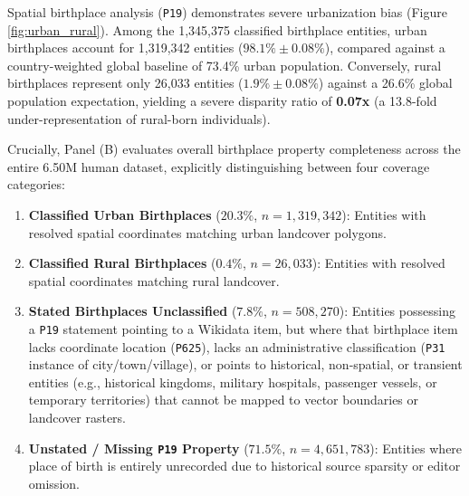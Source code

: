 \documentclass[11pt,a4paper]{article}
\begin{document}
Spatial birthplace analysis (\texttt{P19}) demonstrates severe urbanization bias (Figure \ref{fig:urban_rural}). Among the 1,345,375 classified birthplace entities, urban birthplaces account for 1,319,342 entities ($98.1\% \pm 0.08\%$), compared against a country-weighted global baseline of 73.4\% urban population. Conversely, rural birthplaces represent only 26,033 entities ($1.9\% \pm 0.08\%$) against a 26.6\% global population expectation, yielding a severe disparity ratio of \textbf{0.07x} (a 13.8-fold under-representation of rural-born individuals).

Crucially, Panel (B) evaluates overall birthplace property completeness across the entire 6.50M human dataset, explicitly distinguishing between four coverage categories:
\begin{enumerate}
    \item \textbf{Classified Urban Birthplaces} ($20.3\%$, $n=1,319,342$): Entities with resolved spatial coordinates matching urban landcover polygons.
    \item \textbf{Classified Rural Birthplaces} ($0.4\%$, $n=26,033$): Entities with resolved spatial coordinates matching rural landcover.
    \item \textbf{Stated Birthplaces Unclassified} ($7.8\%$, $n=508,270$): Entities possessing a \texttt{P19} statement pointing to a Wikidata item, but where that birthplace item lacks coordinate location (\texttt{P625}), lacks an administrative classification (\texttt{P31} instance of city/town/village), or points to historical, non-spatial, or transient entities (e.g., historical kingdoms, military hospitals, passenger vessels, or temporary territories) that cannot be mapped to vector boundaries or landcover rasters.
    \item \textbf{Unstated / Missing \texttt{P19} Property} ($71.5\%$, $n=4,651,783$): Entities where place of birth is entirely unrecorded due to historical source sparsity or editor omission.
\end{enumerate}
\end{document}
